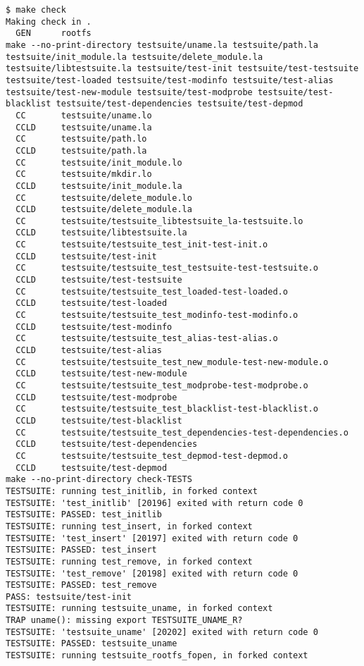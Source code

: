 \documentclass[11pt,a4paper]{article}
\begin{document}
{\begin{shaded}\begin{verbatim}
$ make check
Making check in .
  GEN      rootfs
make --no-print-directory testsuite/uname.la testsuite/path.la testsuite/init_module.la testsuite/delete_module.la testsuite/libtestsuite.la testsuite/test-init testsuite/test-testsuite testsuite/test-loaded testsuite/test-modinfo testsuite/test-alias testsuite/test-new-module testsuite/test-modprobe testsuite/test-blacklist testsuite/test-dependencies testsuite/test-depmod
  CC       testsuite/uname.lo
  CCLD     testsuite/uname.la
  CC       testsuite/path.lo
  CCLD     testsuite/path.la
  CC       testsuite/init_module.lo
  CC       testsuite/mkdir.lo
  CCLD     testsuite/init_module.la
  CC       testsuite/delete_module.lo
  CCLD     testsuite/delete_module.la
  CC       testsuite/testsuite_libtestsuite_la-testsuite.lo
  CCLD     testsuite/libtestsuite.la
  CC       testsuite/testsuite_test_init-test-init.o
  CCLD     testsuite/test-init
  CC       testsuite/testsuite_test_testsuite-test-testsuite.o
  CCLD     testsuite/test-testsuite
  CC       testsuite/testsuite_test_loaded-test-loaded.o
  CCLD     testsuite/test-loaded
  CC       testsuite/testsuite_test_modinfo-test-modinfo.o
  CCLD     testsuite/test-modinfo
  CC       testsuite/testsuite_test_alias-test-alias.o
  CCLD     testsuite/test-alias
  CC       testsuite/testsuite_test_new_module-test-new-module.o
  CCLD     testsuite/test-new-module
  CC       testsuite/testsuite_test_modprobe-test-modprobe.o
  CCLD     testsuite/test-modprobe
  CC       testsuite/testsuite_test_blacklist-test-blacklist.o
  CCLD     testsuite/test-blacklist
  CC       testsuite/testsuite_test_dependencies-test-dependencies.o
  CCLD     testsuite/test-dependencies
  CC       testsuite/testsuite_test_depmod-test-depmod.o
  CCLD     testsuite/test-depmod
make --no-print-directory check-TESTS
TESTSUITE: running test_initlib, in forked context
TESTSUITE: 'test_initlib' [20196] exited with return code 0
TESTSUITE: PASSED: test_initlib
TESTSUITE: running test_insert, in forked context
TESTSUITE: 'test_insert' [20197] exited with return code 0
TESTSUITE: PASSED: test_insert
TESTSUITE: running test_remove, in forked context
TESTSUITE: 'test_remove' [20198] exited with return code 0
TESTSUITE: PASSED: test_remove
PASS: testsuite/test-init
TESTSUITE: running testsuite_uname, in forked context
TRAP uname(): missing export TESTSUITE_UNAME_R?
TESTSUITE: 'testsuite_uname' [20202] exited with return code 0
TESTSUITE: PASSED: testsuite_uname
TESTSUITE: running testsuite_rootfs_fopen, in forked context

\end{verbatim}
\end{shaded}}
\end{document}
